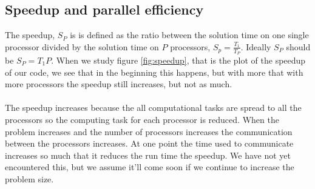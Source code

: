 \subsection*{Speedup and parallel efficiency}
The speedup, $S_P$ is is defined as the ratio between the solution time on one single processor divided by the solution time on $P$ processors, $S_p=\frac{T_1}{T_P}$. Ideally $S_P$ should be $S_P=T_1P$. When we study figure \ref{fig:speedup}, that is the plot of the speedup of our code, we see that in the beginning this happens, but with more that with more processors the speedup still increases, but not as much.
\\ \\
The speedup increases because the all computational tasks are spread to all the processors so the computing task for each processor is reduced. When the problem increases and the number of processors increases the communication between the processors increases. At one point the time used to communicate increases so much that it reduces the run time the speedup. We have not yet encountered this, but we assume it'll come soon if we continue to increase the problem size.
\\ \\
